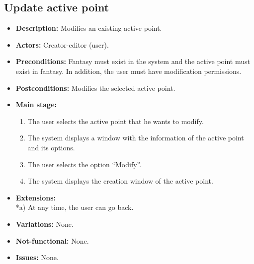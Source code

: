 \subsection{Update active point}
\begin{itemize}
	\item \textbf{Description:} Modifies an existing active point.
	\item \textbf{Actors:} Creator-editor (user).
	\item \textbf{Preconditions:} Fantasy must exist in the system and the active point must exist in fantasy. In addition, the user must have modification permissions.
	\item \textbf{Postconditions:} Modifies the selected active point.
	\item \textbf{Main stage:}
	\begin{enumerate}
		\item The user selects the active point that he wants to modify.
		\item The system displays a window with the information of the active point and its options.
		\item The user selects the option ``Modify''.
		\item The system displays the creation window of the active point.
	\end{enumerate}
	\item \textbf{Extensions:} \\ *a) At any time, the user can go back.
	\item \textbf{Variations:} None.
	\item \textbf{Not-functional:} None.
	\item \textbf{Issues:} None.
\end{itemize}

